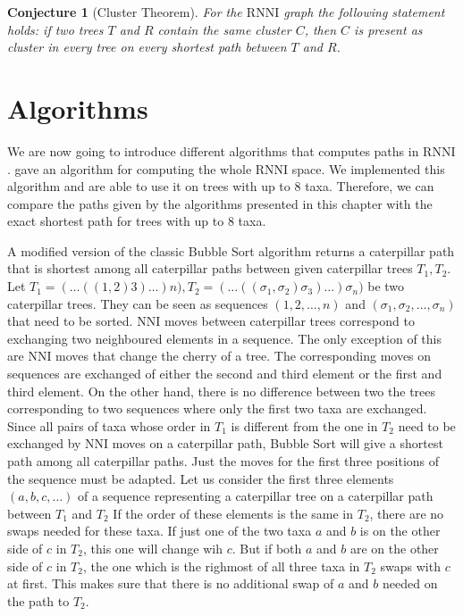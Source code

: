 \documentclass[11pt, a4paper]{article}
\newcommand{\nni}{\mathrm{NNI}}
\newcommand{\rnni}{\mathrm{RNNI}}
\newtheorem{conjecture}[definition]{Conjecture}
\begin{document}
\begin{conjecture}[Cluster Theorem]
	For the $\rnni$ graph the following statement holds:
	if two trees $T$ and $R$ contain the same cluster $C$, then $C$ is present as cluster in every tree on every shortest path between $T$ and $R$.
	\label{cluster_theorem}
\end{conjecture}


\section{Algorithms}

We are now going to introduce different algorithms that computes paths in $\rnni$.
\cite{Gavryushkin2017} gave an algorithm for computing the whole $\rnni$ space.
We implemented this algorithm and are able to use it on trees with up to $8$ taxa.
Therefore, we can compare the paths given by the algorithms presented in this chapter with the exact shortest path for trees with up to $8$ taxa.


A modified version of the classic Bubble Sort  algorithm returns a caterpillar path that is shortest among all caterpillar paths between given caterpillar trees $T_1, T_2$.
Let $T_1 = (\ldots((1,2)3) \ldots )n), T_2 = (\ldots((\sigma_1,\sigma_2)\sigma_3) \ldots )\sigma_n)$ be two caterpillar trees.
They can be seen as sequences $(1,2,\ldots,n)$ and $(\sigma_1, \sigma_2, \ldots, \sigma_n)$ that need to be sorted.
$\nni$ moves between caterpillar trees correspond to exchanging two neighboured elements in a sequence.
The only exception of this are $\nni$ moves that change the cherry of a tree.
The corresponding moves on sequences are exchanged of either the second and third element or the first and third element.
On the other hand, there is no difference between two the trees corresponding to two sequences where only the first two taxa are exchanged.
Since all pairs of taxa whose order in $T_1$ is different from the one in $T_2$ need to be exchanged by $\nni$ moves on a caterpillar path, Bubble Sort will give a shortest path among all caterpillar paths.
Just the moves for the first three positions of the sequence must be adapted.
Let us consider the first three elements $(a,b,c,\ldots)$ of a sequence representing a caterpillar tree on a caterpillar path between $T_1$ and $T_2$
If the order of these elements is the same in $T_2$, there are no swaps needed for these taxa.
If just one of the two taxa $a$ and $b$ is on the other side of $c$ in $T_2$, this one will change wih $c$.
But if both $a$ and $b$ are on the other side of $c$ in $T_2$, the one which is the righmost of all three taxa in $T_2$ swaps with $c$ at first.
This makes sure that there is no additional swap of $a$ and $b$ needed on the path to $T_2$.
\end{document}
